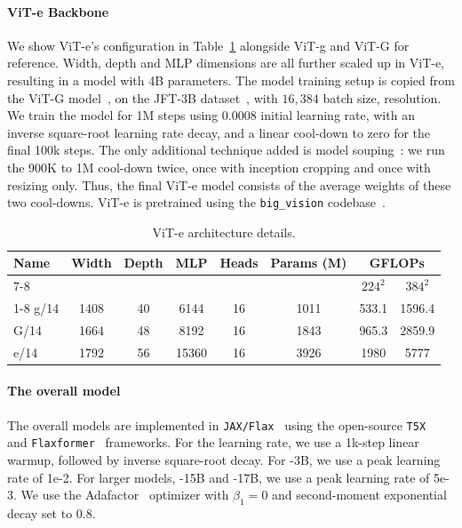 \paragraph{ViT-e Backbone} 
We show ViT-e's configuration in Table~\ref{tbl:model_arch} alongside ViT-g and ViT-G for reference. 
Width, depth and MLP dimensions are all further scaled up in ViT-e, resulting in a model with 4B parameters.
The model training setup is copied from the ViT-G model~\citep{zhai-21-scalingvit}, on the JFT-3B dataset~\citep{zhai-21-scalingvit}, with $16,384$ batch size,  resolution.
We train the model for 1M steps using 0.0008 initial learning rate, with an inverse square-root learning rate decay, and a linear cool-down to zero for the final 100k steps.
The only additional technique added is model souping~\citep{model_soup}: we run the 900K to 1M cool-down twice, once with inception cropping and once with resizing only.
Thus, the final ViT-e model consists of the average weights of these two cool-downs.
ViT-e is pretrained using the {\tt big\_vision} codebase~\citep{big_vision}.


\begin{table}[ht!]
\centering
  \begin{tabular}{lccccccc}
    \toprule
    \multirow{2}{*}{\bf{Name}} & \multirow{2}{*}{\bf{Width}} & \multirow{2}{*}{\bf{Depth}} & \multirow{2}{*}{\bf{MLP}} & \multirow{2}{*}{\bf{Heads}} & \multirow{2}{*}{\bf{Params (M)}} &
    \multicolumn{2}{c}{\bf{GFLOPs}} \\
    \cmidrule[0.5pt]{7-8}
     &  &  &  &  & & \small{$224^2$} & \small{$384^2$} \\
    \cmidrule[0.5pt]{1-8}
    g/14  & 1408 & 40 & 6144 & 16 & 1011 & 533.1 & 1596.4 \\
    G/14  & 1664 & 48 & 8192 & 16 & 1843 & 965.3 & 2859.9 \\
    e/14  & 1792 & 56 & 15360 & 16 & 3926 & 1980 & 5777 \\
    \bottomrule
  \end{tabular}
  \caption{ViT-e architecture details.}
  \label{tbl:model_arch}
\end{table}

\paragraph{The overall model}
The overall \NAME models are implemented in {\tt JAX/Flax}~\citep{jax2018github} using the open-source {\tt T5X}~\citep{t5x} and {\tt Flaxformer}~\citep{flax2020github} frameworks. 
For the learning rate, we use a 1k-step linear warmup, followed by inverse square-root decay.
For \NAME-3B, we use a peak learning rate of 1e-2.
For larger models, \NAME-15B and \NAME-17B, we use a peak learning rate of 5e-3. We use the Adafactor~\citep{shazeer2018adafactor} optimizer with $\beta_1=0$ and second-moment exponential decay set to 0.8.

